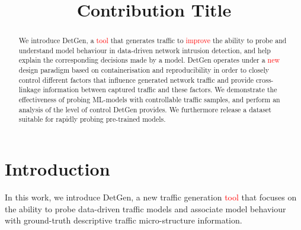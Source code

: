 \documentclass[runningheads]{llncs}
\begin{document}
\title{Contribution Title}
%
%
%
%
%
\maketitle 

\begin{abstract}

We introduce DetGen, a \textcolor{red}{tool} that generates traffic to \textcolor{red}{improve} the ability to probe and understand model behaviour in data-driven network intrusion detection, and help explain the corresponding decisions made by a model. 
DetGen operates under a \textcolor{red}{new} design paradigm based on containerisation and reproducibility in order to closely control different factors that influence generated network traffic and provide cross-linkage information between captured traffic and these factors.
We demonstrate the effectiveness of probing ML-models with controllable traffic samples, and perform an analysis of the level of control DetGen provides. We furthermore release a dataset suitable for rapidly probing pre-trained models. 
\end{abstract}





\section{Introduction}

In this work, we introduce DetGen, a new traffic generation \textcolor{red}{tool} that focuses on the ability to probe data-driven traffic models and associate model behaviour with ground-truth descriptive traffic micro-structure information.
\end{document}

